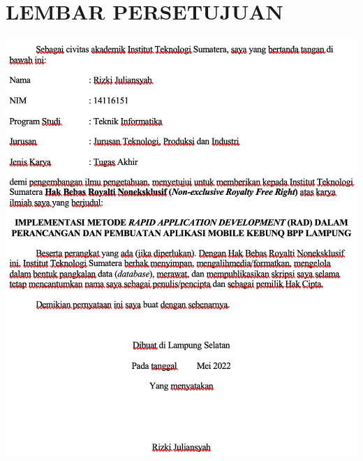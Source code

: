 %
\doublespacing
\chapter*{\uppercase{LEMBAR PERSETUJUAN}}
\centering
\includegraphics[width=15cm]{images/pernyataan.png}\\


